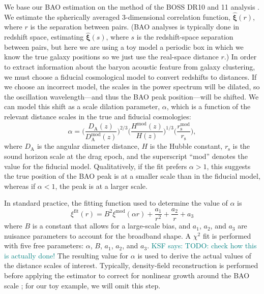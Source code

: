 \documentclass[modern]{aastex62}
\newcommand{\bld}[1]{\bm{#1}} %
\newcommand{\KSF}[1]{\textcolor{teal}{KSF says: #1}}
\begin{document}
We base our BAO estimation on the method of the BOSS DR10 and 11 analysis \citep{Anderson2014}.
We estimate the spherically averaged 3-dimensional correlation function, $\bld{\hat{\xi}}(r)$, where $r$ is the separation between pairs.
(BAO analyses is typically done in redshift space, estimating $\bld{\hat{\xi}}(s)$, where $s$ is the redshift-space separation between pairs, but here we are using a toy model a periodic box in which we know the true galaxy positions so we just use the real-space distance $r$.)
In order to extract information about the baryon acoustic feature from galaxy clustering, we must choose a fiducial cosmological model to convert redshifts to distances.
If we choose an incorrect model, the scales in the power spectrum will be dilated, so the oscillation wavelength---and thus the BAO peak position---will be shifted.
We can model this shift as a scale dilation parameter, $\alpha$, which is a function of the relevant distance scales in the true and fiducial cosmologies:
\begin{equation} \label{eq:alpha}
\alpha = \Bigg( \frac{D_\mathrm{A}(z)}{D_\mathrm{A}^{\text{mod}}(z)} \Bigg)^{2/3} \Bigg( \frac{H^{\text{mod}}(z)}{H(z)} \Bigg)^{1/3} \Bigg( \frac{r_\mathrm{s}^{\text{mod}}}{r_\mathrm{s}} \Bigg),
\end{equation}
where $D_\mathrm{A}$ is the angular diameter distance, $H$ is the Hubble constant, $r_\mathrm{s}$ is the sound horizon scale at the drag epoch, and the superscript ``$\text{mod}$'' denotes the value for the fiducial model.
Qualitatively, if the fit prefers $\alpha>1$, this suggests the true position of the BAO peak is at a smaller scale than in the fiducial model, whereas if $\alpha<1$, the peak is at a larger scale.

In standard practice, the fitting function used to determine the value of $\alpha$ is
\begin{equation}
\xi^{\mathrm{fit}}(r) = B^2 \xi^{\mathrm{mod}}(\alpha r) + \frac{a_1}{r^2} + \frac{a_2}{r} + a_3
\end{equation}
where $B$ is a constant that allows for a large-scale bias, and $a_1$, $a_2$, and $a_3$ are nuisance parameters to account for the broadband shape.
A $\chi^2$ fit is performed with five free parameters: $\alpha$, $B$, $a_1$, $a_2$, and $a_3$. 
\KSF{TODO: check how this is actually done!}
The resulting value for $\alpha$ is used to derive the actual values of the distance scales of interest.
Typically, density-field reconstruction is performed before applying the estimator to correct for nonlinear growth around the BAO scale \citep{Eisenstein2007}; for our toy example, we will omit this step.
\end{document}
